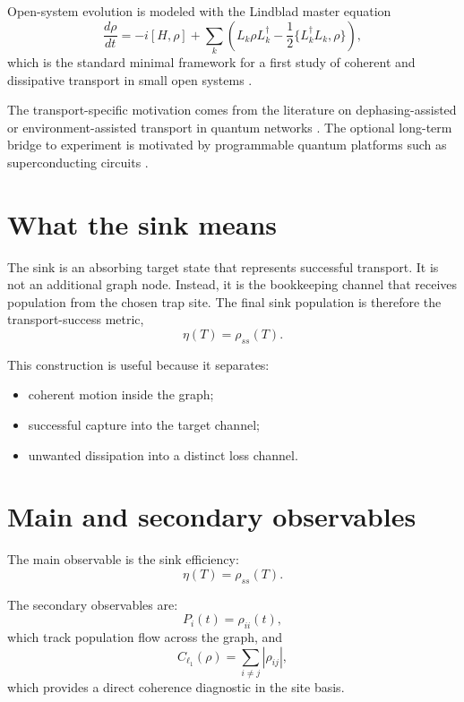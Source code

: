 \documentclass[11pt,a4paper]{article}
\begin{document}
Open-system evolution is modeled with the Lindblad master equation
\begin{equation}
\frac{d\rho}{dt}
= -i[H,\rho]
+ \sum_k \left(
L_k \rho L_k^\dagger - \frac{1}{2}\{L_k^\dagger L_k,\rho\}
\right),
\end{equation}
which is the standard minimal framework for a first study of coherent and
dissipative transport in small open systems
\citep{breuer_petruccione_2007,rivas_huelga_2012}.

The transport-specific motivation comes from the literature on
dephasing-assisted or environment-assisted transport in quantum networks
\citep{mohseni_2008,plenio_huelga_2008,rebentrost_2009,caruso_2009,marais_2013,coates_2021,coates_2023}.
The optional long-term bridge to experiment is motivated by programmable quantum
platforms such as superconducting circuits
\citep{potocnik_2018,zhang_2024_transport,naeij_2025}.

\section{What the sink means}

The sink is an absorbing target state that represents successful transport. It
is not an additional graph node. Instead, it is the bookkeeping channel that
receives population from the chosen trap site. The final sink population is
therefore the transport-success metric,
\begin{equation}
\eta(T) = \rho_{ss}(T).
\end{equation}

This construction is useful because it separates:
\begin{itemize}
  \item coherent motion inside the graph;
  \item successful capture into the target channel;
  \item unwanted dissipation into a distinct loss channel.
\end{itemize}

\section{Main and secondary observables}

The main observable is the sink efficiency:
\begin{equation}
\eta(T)=\rho_{ss}(T).
\end{equation}

The secondary observables are:
\begin{equation}
P_i(t)=\rho_{ii}(t),
\end{equation}
which track population flow across the graph, and
\begin{equation}
C_{\ell_1}(\rho)=\sum_{i\neq j}|\rho_{ij}|,
\end{equation}
which provides a direct coherence diagnostic in the site basis.
\end{document}
